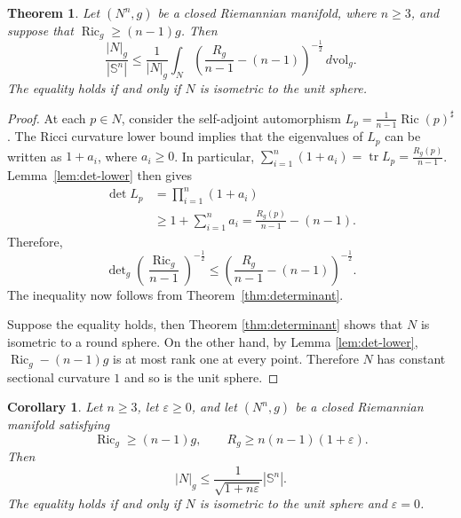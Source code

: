 \documentclass[11pt, reqno]{amsart}
\newtheorem{theorem}{Theorem}
\newtheorem{corollary}{Corollary}
\begin{document}
\begin{theorem}\label{thm:main}
Let $(N^n, g)$ be a closed Riemannian manifold, where $n\ge 3$, and suppose
that $\operatorname{Ric}_g\ge (n-1)g$.
Then
\begin{equation}\label{eq:scalar-curvature-volume-bound}
\frac{|N|_g}{|\mathbb S^n|}
\le \frac{1}{|N|_g} \int_N \left(\frac{R_g}{n-1}-(n-1) \right)^{-\frac12} \, d\mathrm{vol}_g.
\end{equation}
The equality holds if and only if $N$ is isometric to the unit sphere.
\end{theorem}

\begin{proof}
At each $p\in N$, consider the self-adjoint automorphism $L_p=\frac{1}{n-1}\operatorname{Ric}(p)^\sharp$. The Ricci curvature lower bound implies that the eigenvalues of $L_p$ can be written as $1+a_i$, where $a_i\ge 0$. In particular, $\sum_{i=1}^n(1+a_i) = \operatorname{tr}L_p = \frac{R_g(p)}{n-1}$. Lemma~\ref{lem:det-lower} then gives
\begin{align*}
\det L_p
& =
\prod_{i=1}^n(1+a_i)\\
& \ge
1+\sum_{i=1}^n a_i
=
\frac{R_g(p)}{n-1}-(n-1).
\end{align*}
Therefore,
$$
\det\nolimits_g
\left(\frac{\operatorname{Ric}_g}{n-1}\right)^{-\frac12}
\le
\left(
\frac{R_g}{n-1}-(n-1)
\right)^{-\frac12}.
$$
The inequality now follows from Theorem~\ref{thm:determinant}.

Suppose the equality holds, then Theorem \ref{thm:determinant} shows that $N$ is isometric to a round sphere. On the other hand, by Lemma \ref{lem:det-lower}, $\operatorname{Ric}_g-(n-1) g$ is at most rank one at every point. Therefore $N$ has constant sectional curvature $1$ and so is the unit sphere.
\end{proof}

\begin{corollary}\label{cor:uniform-scalar-bound}
Let $n\ge 3$, let $\varepsilon\ge0$, and let $(N^n, g)$ be a closed
Riemannian manifold satisfying
\begin{equation*}\label{eq:main-assumptions}
\operatorname{Ric}_g\ge (n-1)g,
\qquad
R_g\ge n(n-1)(1+\varepsilon).
\end{equation*}
Then
\begin{equation*}\label{eq:main-bound}
|N|_g \le \frac{1}{\sqrt{1+n\varepsilon}} |\mathbb S^n|.
\end{equation*}
The equality holds if and only if $N$ is isometric to the unit sphere and $\varepsilon=0$.
\end{corollary}
\end{document}
